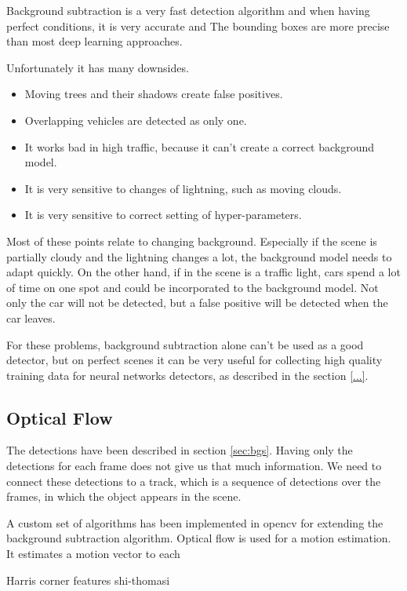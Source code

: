 \documentclass[a4paper,12pt,titlepage, twoside]{article}
\numberwithin{figure}{section}
\begin{document}
Background subtraction is a very fast detection algorithm and when having perfect conditions, it is very accurate and The bounding boxes are more precise than most deep learning approaches.

Unfortunately it has many downsides. 

\begin{itemize}
\item Moving trees and their shadows create false positives.
\item Overlapping vehicles are detected as only one.
\item It works bad in high traffic, because it can't create a correct background model.
\item It is very sensitive to changes of lightning, such as moving clouds.
\item It is very sensitive to correct setting of hyper-parameters.
\end{itemize}

Most of these points relate to changing background. Especially if the scene is partially cloudy and the lightning changes a lot, the background model needs to adapt quickly. On the other hand, if in the scene is a traffic light, cars spend a lot of time on one spot and could be incorporated to the background model. Not only the car will not be detected, but a false positive will be detected when the car leaves.

For these problems, background subtraction alone can't be used as a good detector, but on perfect scenes  it can be very useful for collecting high quality training data for neural networks detectors, as described in the section \ref{...}.

\subsection{Optical Flow}

The detections have been described in section \ref{sec:bgs}. Having only the detections for each frame does not give us that much information. We need to connect these detections to a track, which is a sequence of detections over the frames, in which the object appears in the scene.

A custom set of algorithms has been implemented in opencv\cite{opencv} for extending the background subtraction algorithm. Optical flow \cite{optical-flow} is used for a motion estimation. It estimates a motion vector to each 


Harris corner features
shi-thomasi
\end{document}
